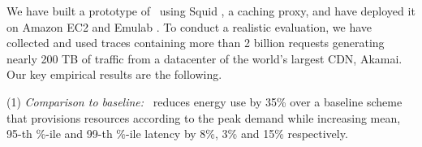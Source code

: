 



We have built a prototype of \shrink\ using Squid  \cite{squid}, a caching proxy, and have deployed it on Amazon EC2 \cite{ec2} and Emulab \cite{emulab}. To conduct a realistic evaluation, we have collected and used traces containing more than 2 billion requests generating nearly 200 TB of traffic from a datacenter of the world's largest CDN, Akamai. Our key empirical results are the following. 

(1) \emph{Comparison to baseline:}  \shrink\ reduces energy use by 35\% over a baseline scheme that provisions resources according to the peak demand while increasing mean, 95-th \%-ile and 99-th \%-ile latency by 8\%, 3\% and 15\% respectively. 

